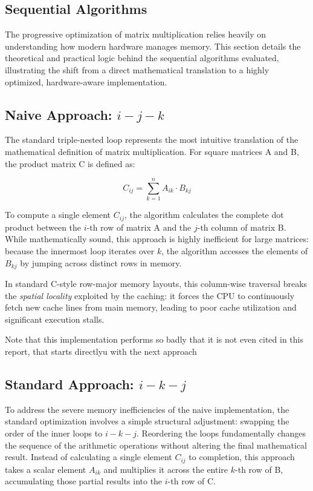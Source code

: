 \begin{appendices}
\section{Sequential Algorithms}\label{app:algorithms}
The progressive optimization of matrix multiplication relies heavily on understanding how modern hardware manages memory. This section details the theoretical and practical logic behind the sequential algorithms evaluated, illustrating the shift from a direct mathematical translation to a highly optimized, hardware-aware implementation.


\subsection{Naive Approach: $i-j-k$}\label{subsec:ijk}

The standard triple-nested loop represents the most intuitive translation of the mathematical definition of matrix multiplication. For square matrices A and B, the product matrix C is defined as:

$$C_{ij}=\sum_{k=1}^{n}A_{ik}\cdot B_{kj}$$

To compute a single element $C_{ij}$, the algorithm calculates the complete dot product between the $i$-th row of matrix A and the $j$-th column of matrix B. 
While mathematically sound, this approach is highly inefficient for large matrices: because the innermost loop iterates over $k$, the algorithm accesses the elements of $B_{kj}$ by jumping across distinct rows in memory. 

In standard C-style row-major memory layouts, this column-wise traversal breaks the \emph{spatial locality} exploited by the caching: it forces the CPU to continuously fetch new cache lines from main memory, leading to poor cache utilization and significant execution stalls.

Note that this implementation performs so badly that it is not even cited in this report, that starts directlyu with  the next approach

\subsection{Standard Approach: $i-k-j$}\label{subsec:ikj}

To address the severe memory inefficiencies of the naive implementation, the standard optimization involves a simple structural adjustment: swapping the order of the inner loops to $i-k-j$. Reordering the loops fundamentally changes the sequence of the arithmetic operations without altering the final mathematical result. Instead of calculating a single element $C_{ij}$ to completion, this approach takes a scalar element $A_{ik}$ and multiplies it across the entire $k$-th row of B, accumulating those partial results into the $i$-th row of C.


\end{appendices}
